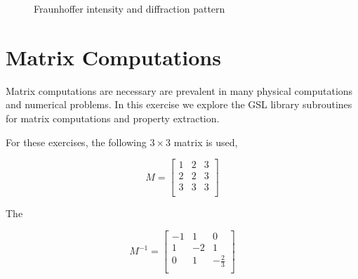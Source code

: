\documentclass{article}
\begin{document}
\begin{figure}[H]
  \begin{center}
  \end{center}
  \caption{Fraunhoffer intensity and diffraction pattern}
  \label{fig:fraun_int}
\end{figure}


\section{Matrix Computations}

Matrix computations are necessary are prevalent in many physical computations and numerical problems. In this exercise we explore
the GSL library subroutines for matrix computations and property extraction.

For these exercises, the following $3 \times 3$ matrix is used,

\begin{equation}
 \label{eq:mat}
 M = \begin{bmatrix}
       1 & 2 & 3 \\[0.3em]
       2 & 2 & 3 \\[0.3em]
       3 & 3 & 3 \\[0.3em]
      \end{bmatrix}
\end{equation}

The

\begin{equation}
 \label{eq:mat}
 M^{-1} = \begin{bmatrix}
       -1 & 1 & 0 \\[0.3em]
       1 & -2 & 1 \\[0.3em]
       0 & 1 &  -\frac{2}{3}\\[0.3em]
      \end{bmatrix}
\end{equation}
\end{document}
